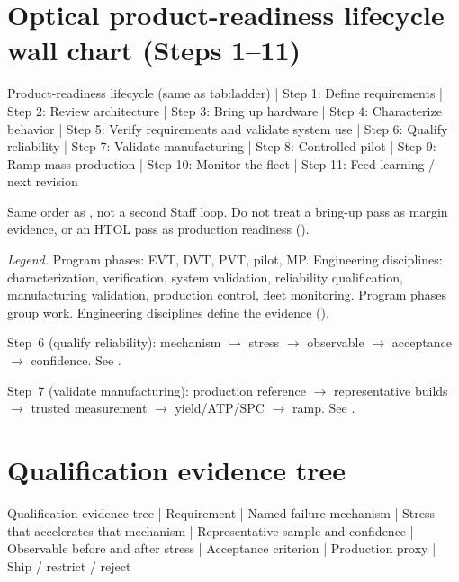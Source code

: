 \section{Optical product-readiness lifecycle wall chart (Steps 1--11)}
\label{sec:tree-qualification}

\begin{dectree}
Product-readiness lifecycle (same as tab:ladder)
  |
Step 1: Define requirements
  |
Step 2: Review architecture
  |
Step 3: Bring up hardware
  |
Step 4: Characterize behavior
  |
Step 5: Verify requirements and validate system use
  |
Step 6: Qualify reliability
  |
Step 7: Validate manufacturing
  |
Step 8: Controlled pilot
  |
Step 9: Ramp mass production
  |
Step 10: Monitor the fleet
  |
Step 11: Feed learning / next revision
\end{dectree}

Same order as , not a second Staff loop. Do not treat a
bring-up pass as margin evidence, or an HTOL pass as production readiness
().

\textit{Legend.} Program phases: EVT, DVT, PVT, pilot, MP. Engineering
disciplines: characterization, verification, system validation, reliability
qualification, manufacturing validation, production control, fleet monitoring.
Program phases group work. Engineering disciplines define the evidence
().

Step~6 (qualify reliability): mechanism $\rightarrow$ stress $\rightarrow$
observable $\rightarrow$ acceptance $\rightarrow$ confidence. See
.

Step~7 (validate manufacturing): production reference $\rightarrow$
representative builds $\rightarrow$ trusted measurement $\rightarrow$
yield/ATP/SPC $\rightarrow$ ramp. See .

\section{Qualification evidence tree}
\label{sec:tree-qual-evidence}

\begin{dectree}
Qualification evidence tree
  |
Requirement
  |
Named failure mechanism
  |
Stress that accelerates that mechanism
  |
Representative sample and confidence
  |
Observable before and after stress
  |
Acceptance criterion
  |
Production proxy
  |
Ship / restrict / reject
\end{dectree}


